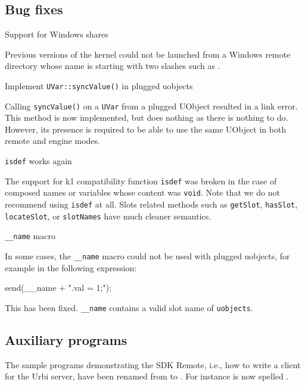 \subsection{Bug fixes}
\begin{description}
\item Support for Windows shares

  Previous versions of the kernel could not be launched from a Windows
  remote directory whose name is starting with two slashes such as
  .

\item Implement \lstinline{UVar::syncValue()} in plugged uobjects

  Calling \lstinline{syncValue()} on a \lstinline{UVar} from a plugged
  UObject resulted in a link error.  This method is now implemented, but
  does nothing as there is nothing to do. However, its presence is required
  to be able to use the same UObject in both remote and engine modes.

\item \lstinline{isdef} works again

  The support for k1 compatibility function \lstinline{isdef} was broken in
  the case of composed names or variables whose content was
  \lstinline{void}. Note that we do not recommend using \lstinline{isdef} at
  all. Slots related methods such as \lstinline{getSlot},
  \lstinline{hasSlot}, \lstinline{locateSlot}, or \lstinline{slotNames} have
  much cleaner semantics.

\item \lstinline{__name} macro

  In some cases, the \lstinline|__name| macro could not be used with
  plugged uobjects, for example in the following expression:

\begin{urbiunchecked}
send(__name + ".val = 1;");
\end{urbiunchecked}
  \noindent
  This has been fixed. \lstinline|__name| contains a valid slot name
  of \lstinline|uobjects|.
\end{description}

\subsection{Auxiliary programs}

The sample programs demonstrating the SDK Remote, i.e., how to write a
client for the Urbi server, have been renamed from  to
.  For instance  is now spelled
.

